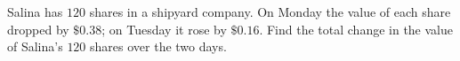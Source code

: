 Salina has $120$ shares in a shipyard company. On Monday the value of each share dropped by $\$0.38$; on Tuesday it rose by $\$0.16$. Find the total change in the value of Salina's $120$ shares over the two days.
